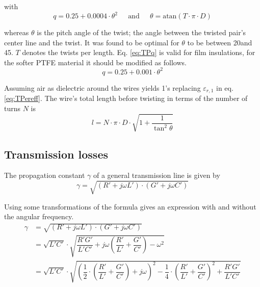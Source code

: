 with
\begin{equation}
\label{eq:TPq}
q = 0.25 + 0.0004\cdot \theta^2
\;\;\;\; \textrm{ and } \;\;\;\;
\theta = \textrm{atan}\left(T\cdot\pi\cdot D\right)
\end{equation}

whereas $\theta$ is the pitch angle of the twist; the angle between
the twisted pair's center line and the twist.  It was found to be
optimal for $\theta$ to be between 20\degree and 45\degree.  $T$
denotes the twists per length.  Eq. \eqref{eq:TPq} is valid for film
insulations, for the softer PTFE material it should be modified as
follows.
\begin{equation}
q = 0.25 + 0.001\cdot \theta^2
\end{equation}

Assuming air as dielectric around the wires yields 1's replacing
$\varepsilon_{r,1}$ in eq. \eqref{eq:TPereff}.  The wire's total
length before twisting in terms of the number of turns $N$ is
\begin{equation}
l = N\cdot\pi\cdot D\cdot\sqrt{1 + \dfrac{1}{\tan^2{\theta}}}
\end{equation}

\subsection{Transmission losses}

The propagation constant $\gamma$ of a general transmission line is
given by
\begin{equation}
\gamma = \sqrt{\left(R' + j\omega L'\right)\cdot \left(G' + j\omega C'\right)}
\end{equation}

Using some transformations of the formula gives an expression with and
without the angular frequency.
\begin{equation}
\label{eq:gamma_rlgc}
\begin{split}
\gamma &= \sqrt{\left(R' + j\omega L'\right)\cdot \left(G' + j\omega C'\right)}\\
&= \sqrt{L'C'}\cdot\sqrt{\dfrac{R'G'}{L'C'} + j\omega\left(\dfrac{R'}{L'} + \dfrac{G'}{C'}\right) - \omega^2}\\
&= \sqrt{L'C'}\cdot\sqrt{\left(\dfrac{1}{2}\cdot\left(\dfrac{R'}{L'} + \dfrac{G'}{C'}\right) + j\omega\right)^2 - \dfrac{1}{4}\cdot\left(\dfrac{R'}{L'} + \dfrac{G'}{C'}\right)^2 + \dfrac{R'G'}{L'C'}}
\end{split}
\end{equation}

